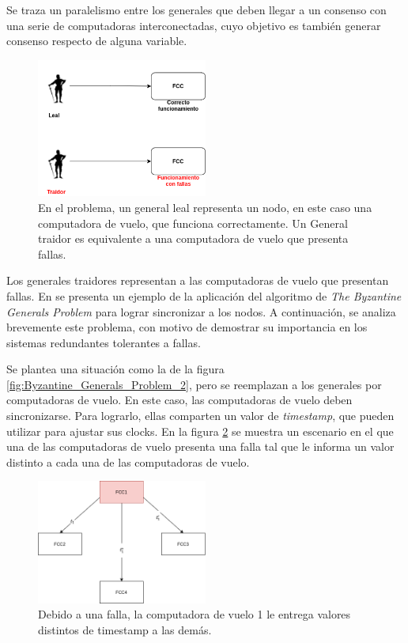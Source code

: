 Se traza un paralelismo entre los generales que deben llegar a un consenso con una serie de computadoras interconectadas, cuyo objetivo es también generar consenso respecto de alguna variable.

\begin{figure}[H]
    \centering
    \includegraphics[width=0.5\textwidth]{img/Byzantine_Generals_Problem_4.png}
    \caption{En el problema, un general leal representa un nodo, en este caso una computadora de vuelo, que funciona correctamente. Un General traidor es equivalente a una computadora de vuelo que presenta fallas.}
    \label{fig:Byzantine_Generals_Problem_4}
\end{figure}

Los generales traidores representan a las computadoras de vuelo que presentan fallas. En \cite{wensley1978sift} se presenta un ejemplo de la aplicación del algoritmo de \textit{The Byzantine Generals Problem} para lograr sincronizar a los nodos. A continuación, se analiza brevemente este problema, con motivo de demostrar su importancia en los sistemas redundantes tolerantes a fallas.

Se plantea una situación como la de la figura \ref{fig:Byzantine_Generals_Problem_2}, pero se reemplazan a los generales por computadoras de vuelo. En este caso, las computadoras de vuelo deben sincronizarse. Para lograrlo, ellas comparten un valor de \textit{timestamp}, que pueden utilizar para ajustar sus clocks. En la figura \ref{fig:Byzantine_Generals_Problem_5} se muestra un escenario en el que una de las computadoras de vuelo presenta una falla tal que le informa un valor distinto a cada una de las computadoras de vuelo.

\begin{figure}[H]
    \centering
    \includegraphics[width=0.5\textwidth]{img/Byzantine_Generals_Problem_5.png}
    \caption{Debido a una falla, la computadora de vuelo 1 le entrega valores distintos de timestamp a las demás.}
    \label{fig:Byzantine_Generals_Problem_5}
\end{figure}

